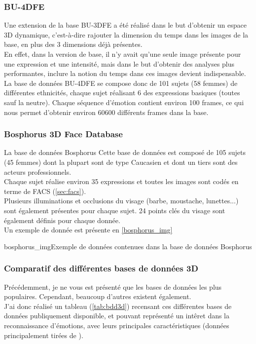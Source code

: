 \documentclass[overfullbox, poster]{polytech/polytech}
\begin{document}
\subsubsection{BU-4DFE}
Une extension de la base BU-3DFE a été réalisé dans le but d'obtenir un espace 3D dynamique, c'est-à-dire rajouter la dimension du temps dans les images de la base, en plus des 3 dimensions déjà présentes.\\
En effet, dans la version de base, il n'y avait qu'une seule image présente pour une expression et une intensité, mais dans le but d'obtenir des analyses plus performantes, inclure la notion du temps dans ces images devient indispensable.\\
La base de données BU-4DFE \cite{bu4dfe_article} se compose donc de 101 sujets (58 femmes) de différentes ethnicités, chaque sujet réalisant 6 des expressions basiques (toutes sauf la neutre). Chaque séquence d'émotion contient environ 100 frames, ce qui nous permet d'obtenir environ 60600 différents frames dans la base.

\subsubsection{Bosphorus 3D Face Database}
La base de données Bosphorus \cite{bosphorus_article}
Cette base de données est composé de 105 sujets (45 femmes) dont la plupart sont de type Caucasien et dont un tiers sont des acteurs professionnels.\\
Chaque sujet réalise environ 35 expressions et toutes les images sont codés en terme de FACS (\autoref{sec:facs}).\\
Plusieurs illuminations et occlusions du visage (barbe, moustache, lunettes...) sont également présentes pour chaque sujet. 24 points clés du visage sont également définis pour chaque donnée.\\
Un exemple de donnée est présente en \autoref{bosphorus_img}

\begin{Figure}{bosphorus_img}{Exemple de données contenues dans la base de données Bosphorus}
\end{Figure}

\subsubsection{Comparatif des différentes bases de données 3D}

Précédemment, je ne vous est présenté que les bases de données les plus populaires. Cependant, beaucoup d'autres existent également.\\
J'ai donc réalisé un tableau (\autoref{tab:bdd3d}) recensant ces différentes bases de données publiquement disponible, et pouvant représenté un intêret dans la reconnaissance d'émotions, avec leurs principales caractéristiques (données principalement tirées de \cite{sota3d}).
\end{document}
